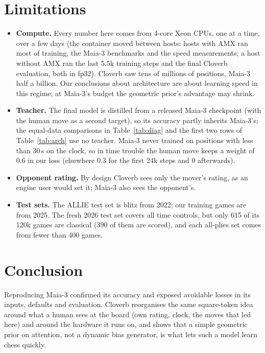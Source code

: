 \section{Limitations}
\begin{itemize}
\item \textbf{Compute.} Every number here comes from 4-core Xeon CPUs, one at a time, over a few days
(the container moved between hosts: hosts with AMX ran most of training, the Maia-3 benchmarks and
the speed measurements; a host without AMX ran the last 5.5k training steps and the final Cloverb
evaluation, both in fp32). Cloverb saw
tens of millions of positions, Maia-3 half a billion. Our conclusions about architecture are about
learning speed in this regime; at Maia-3's budget the geometric prior's advantage may shrink.
\item \textbf{Teacher.} The final model is distilled from a released Maia-3 checkpoint (with the
human move as a second target), so its accuracy partly inherits Maia-3's; the equal-data
comparisons in Table~\ref{tab:diag} and the first two rows of Table~\ref{tab:arch} use no teacher. Maia-3 never trained on
positions with less than 30\,s on the clock, so in time trouble the human move keeps a weight of 0.6
in our loss (elsewhere 0.3 for the first 24k steps and 0 afterwards).
\item \textbf{Opponent rating.} By design Cloverb sees only the mover's rating, as an engine user
would set it; Maia-3 also sees the opponent's.
\item \textbf{Test sets.} The ALLIE test set is blitz from 2022; our training games are from 2025.
The fresh 2026 test set covers all time controls, but only 615 of its 120k games are classical
(390 of them are scored), and each all-plies set comes from fewer than 400 games.
\end{itemize}

\section{Conclusion}
Reproducing Maia-3 confirmed its accuracy and exposed avoidable losses in its inputs, defaults and
evaluation. Cloverb reorganises the same square-token idea around what a human sees at the board
(own rating, clock, the moves that led here) and around the hardware it runs on, and shows that a
simple geometric prior on attention, not a dynamic bias generator, is what lets such a model learn
chess quickly.
